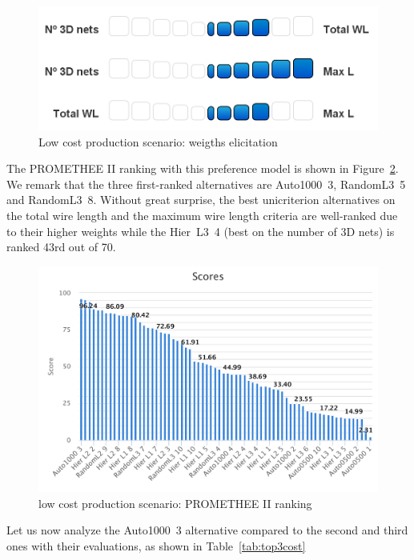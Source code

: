 \documentclass{svmult}
\begin{document}
\begin{figure}[h!]
    \centering
    \includegraphics[width=0.6\linewidth]{elicitcost.png}
    \caption{Low cost production scenario: weigths elicitation}
    \label{fig:elicitcost}
\end{figure}

The PROMETHEE II ranking with this preference model is shown in Figure~\ref{fig:rankingcost}. We remark that the three first-ranked alternatives are Auto1000~3, RandomL3~5 and RandomL3~8. Without great surprise, the best unicriterion alternatives on the total wire length and the maximum wire length criteria are well-ranked due to their higher weights while the Hier~L3~4 (best on the number of 3D nets) is ranked 43rd out of 70.

\begin{figure}[h!]
    \centering
    \includegraphics[width=\linewidth]{rankingcost}
    \caption{low cost production scenario: PROMETHEE II ranking}
    \label{fig:rankingcost}
\end{figure}

Let us now analyze the Auto1000~3 alternative compared to the second and third ones with their evaluations, as shown in Table~\ref{tab:top3cost}
\end{document}
